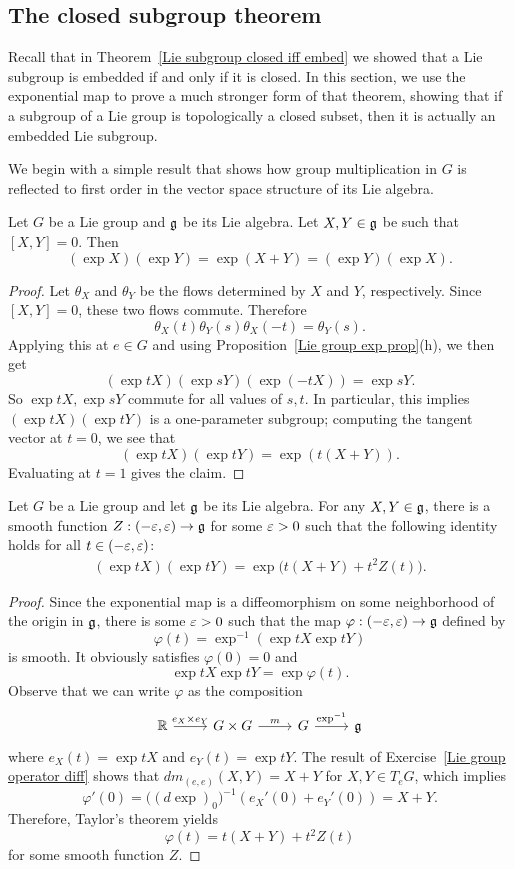 \subsection{The closed subgroup theorem}
Recall that in Theorem~\ref{Lie subgroup closed iff embed} we showed that a Lie subgroup is embedded if and only if it is closed. In this section, we use the exponential map to prove a much stronger form of that theorem, showing that if a subgroup of a Lie group is topologically a closed subset, then it is actually an embedded Lie subgroup.\par
We begin with a simple result that shows how group multiplication in $G$ is reflected to first order in the vector space structure of its Lie algebra.
\begin{proposition}\label{Lie group commuting vector field exp}
Let $G$ be a Lie group and $\mathfrak{g}$ be its Lie algebra. Let $X,Y\in\mathfrak{g}$ be such that $[X,Y]=0$. Then
\[(\exp X)(\exp Y)=\exp(X+Y)=(\exp Y)(\exp X).\]
\end{proposition}
\begin{proof}
Let $\theta_X$ and $\theta_Y$ be the flows determined by $X$ and $Y$, respectively. Since $[X,Y]=0$, these two flows commute. Therefore
\[\theta_X(t)\theta_Y(s)\theta_X(-t)=\theta_Y(s).\]
Applying this at $e\in G$ and using Proposition~\ref{Lie group exp prop}(h), we then get
\[(\exp tX)(\exp sY)(\exp(-tX))=\exp sY.\]
So $\exp tX,\exp sY$ commute for all values of $s,t$. In particular, this implies $(\exp tX)(\exp tY)$ is a one-parameter subgroup; computing the tangent vector at $t=0$, we see that 
\[(\exp tX)(\exp tY)=\exp(t(X+Y)).\]
Evaluating at $t=1$ gives the claim.
\end{proof}
\begin{proposition}
Let $G$ be a Lie group and let $\mathfrak{g}$ be its Lie algebra. For any $X,Y\in\mathfrak{g}$, there is a smooth function $Z:(-\varepsilon,\varepsilon)\to\mathfrak{g}$ for some $\varepsilon>0$ such that the following identity holds for all $t\in(-\varepsilon,\varepsilon)$:
\begin{align}\label{Lie algebra first order-1}
(\exp tX)(\exp tY)=\exp\big(t(X+Y)+t^2Z(t)\big).
\end{align}
\end{proposition}
\begin{proof}
Since the exponential map is a diffeomorphism on some neighborhood of the origin in $\mathfrak{g}$, there is some $\varepsilon>0$ such that the map $\varphi:(-\varepsilon,\varepsilon)\to\mathfrak{g}$ defined by
\[\varphi(t)=\exp^{-1}(\exp tX\exp tY)\]
is smooth. It obviously satisfies $\varphi(0)=0$ and 
\[\exp tX\exp tY=\exp\varphi(t).\]
Observe that we can write $\varphi$ as the composition
\[\begin{tikzcd}
\R\ar[r,"e_X\times e_Y"]&G\times G\ar[r,"m"]&G\ar[r,"\exp^{-1}"]&\g
\end{tikzcd}\]
where $e_X(t)=\exp tX$ and $e_Y(t)=\exp tY$. The result of Exercise~\ref{Lie group operator diff} shows that $dm_{(e,e)}(X,Y)=X+Y$ for $X,Y\in T_eG$, which implies
\[\varphi'(0)=\big((d\exp)_0\big)^{-1}(e_X'(0)+e_Y'(0))=X+Y.\]
Therefore, Taylor's theorem yields
\[\varphi(t)=t(X+Y)+t^2Z(t)\]
for some smooth function $Z$.
\end{proof}
